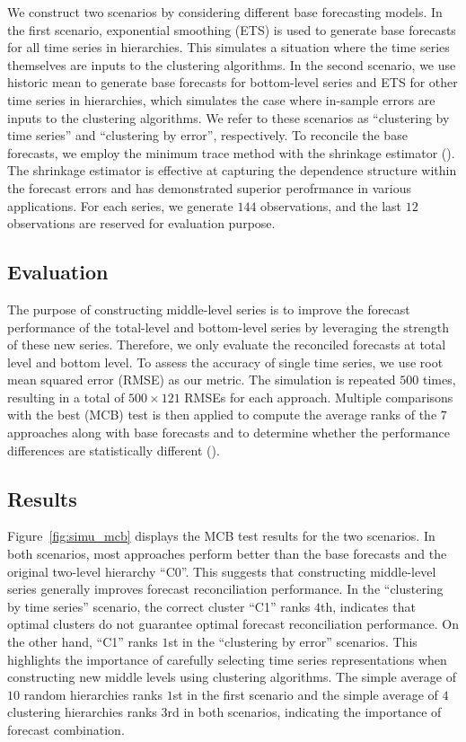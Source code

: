 \documentclass[a4paper,review,12pt,authoryear]{elsarticle}
\begin{document}
We construct two scenarios by considering different base forecasting models. In the first scenario, exponential smoothing (ETS) is used to generate base forecasts for all time series in hierarchies. This simulates a situation where the time series themselves are inputs to the clustering algorithms.
In the second scenario, we use historic mean to generate base forecasts for bottom-level series and ETS for other time series in hierarchies, which simulates the case where in-sample errors are inputs to the clustering algorithms. We refer to these scenarios as ``clustering by time series'' and ``clustering by error'', respectively. To reconcile the base forecasts, we employ the minimum trace method with the shrinkage estimator (\citealp{wickramasuriyaOptimalForecastReconciliation2019}). The shrinkage estimator is effective at capturing the dependence structure within the forecast errors and has demonstrated superior perofrmance in various applications. For each series, we generate $144$ observations, and the last $12$ observations are reserved for evaluation purpose.


\subsection{Evaluation}
\label{sec:simu_eval}

The purpose of constructing middle-level series is to improve the forecast performance of the total-level and bottom-level series by leveraging the strength of these new series.
Therefore, we only evaluate the reconciled forecasts at total level and bottom level. 
To assess the accuracy of single time series, we use root mean squared error (RMSE) as our metric. 
The simulation is repeated $500$ times, resulting in a total of $500\times 121$ RMSEs for each approach. 
Multiple comparisons with the best (MCB) test is then applied to compute the average ranks of the $7$ approaches along with base forecasts and to determine whether the performance differences are statistically different (\citealp{koningM3CompetitionStatistical2005}).


\subsection{Results}
\label{sec:simu_res}

Figure~\ref{fig:simu_mcb} displays the MCB test results for the two scenarios. 
In both scenarios, most approaches perform better than the base forecasts and the original two-level hierarchy ``C0''. This suggests that constructing middle-level series generally improves forecast reconciliation performance.
In the ``clustering by time series'' scenario, the correct cluster ``C1'' ranks $4$th, indicates that optimal clusters do not guarantee optimal forecast reconciliation performance. 
On the other hand, ``C1'' ranks $1$st in the ``clustering by error'' scenarios. This highlights the importance of carefully selecting time series representations when constructing new middle levels using clustering algorithms.
The simple average of $10$ random hierarchies ranks $1$st in the first scenario and the simple average of $4$ clustering hierarchies ranks $3$rd in both scenarios, indicating the importance of forecast combination.
\end{document}
